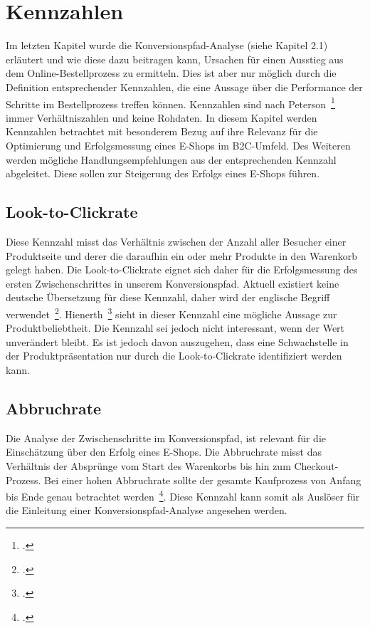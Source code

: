 \newpage
\section{Kennzahlen}
Im letzten Kapitel wurde die Konversionspfad-Analyse (siehe Kapitel 2.1) erläutert und wie diese dazu beitragen kann, Ursachen für einen Ausstieg aus dem Online-Bestellprozess zu ermitteln. Dies ist aber nur möglich durch die Definition entsprechender Kennzahlen, die eine Aussage über die Performance der Schritte im Bestellprozess treffen können. Kennzahlen sind nach Peterson~\footcite[Vgl. ][Seite 8]{Peterson.2006} immer Verhältniszahlen und keine Rohdaten. In diesem Kapitel werden Kennzahlen betrachtet mit besonderem Bezug auf ihre Relevanz für die Optimierung und Erfolgsmessung eines E-Shops im B2C-Umfeld. Des Weiteren werden mögliche Handlungsempfehlungen aus der entsprechenden Kennzahl abgeleitet. Diese sollen zur Steigerung des Erfolgs eines E-Shops führen. 

\subsection{Look-to-Clickrate}
Diese Kennzahl misst das Verhältnis zwischen der Anzahl aller Besucher einer Produktseite und derer die daraufhin ein oder mehr Produkte in den Warenkorb gelegt haben. Die Look-to-Clickrate eignet sich daher für die Erfolgsmessung des ersten Zwischenschrittes in unserem Konversionspfad. Aktuell existiert keine deutsche Übersetzung für diese Kennzahl, daher wird der englische Begriff verwendet~\footcite[Vgl. ][Seite 99]{Hienerth.2010}. Hienerth~\footcite[Vgl. ][Seite 110]{Peterson.2010} sieht in dieser Kennzahl eine mögliche Aussage zur Produktbeliebtheit. Die Kennzahl sei jedoch nicht interessant, wenn der Wert unverändert bleibt. Es ist jedoch davon auszugehen, dass eine Schwachstelle in der Produktpräsentation nur durch die Look-to-Clickrate identifiziert werden kann.

\subsection{Abbruchrate}
Die Analyse der Zwischenschritte im Konversionspfad, ist relevant für die Einschätzung über den Erfolg eines E-Shops. Die Abbruchrate misst das Verhältnis der Absprünge vom Start des Warenkorbs bis hin zum Checkout-Prozess. Bei einer hohen Abbruchrate sollte der gesamte Kaufprozess von Anfang bis Ende genau betrachtet werden~\footcite[Vgl. ][Seite 377]{Kaushik.2007}. Diese Kennzahl kann somit als Auslöser für die Einleitung einer Konversionspfad-Analyse angesehen werden.

